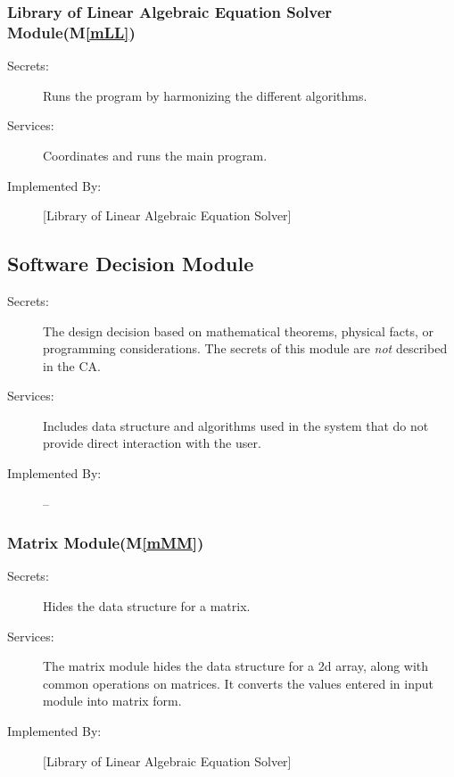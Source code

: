 \documentclass[12pt, titlepage]{article}
\newcommand{\mref}[1]{M\ref{#1}}
\begin{document}
\subsubsection{Library of Linear Algebraic Equation Solver Module(\mref{mLL})}

\begin{description}
\item[Secrets:]Runs the program by harmonizing the different algorithms.
\item[Services:]Coordinates and runs the main program.
\item[Implemented By:] [Library of Linear Algebraic Equation Solver]
\end{description}





\subsection{Software Decision Module}

\begin{description}
\item[Secrets:] The design decision based on mathematical theorems, physical
  facts, or programming considerations. The secrets of this module are
  \emph{not} described in the CA.
\item[Services:] Includes data structure and algorithms used in the system that
  do not provide direct interaction with the user. 
\item[Implemented By:] --
\end{description}

\subsubsection{Matrix Module(\mref{mMM})}
\begin{description}
\item[Secrets:]Hides the data structure for a matrix.
\item[Services:]The matrix module hides the data structure for a 2d array, along with common operations on matrices. It converts the values entered in input module into matrix form.
\item[Implemented By:] [Library of Linear Algebraic Equation Solver]
\end{description}
\end{document}
